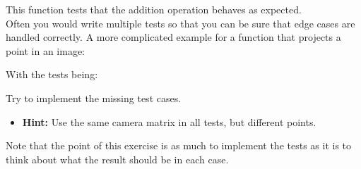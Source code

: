 \documentclass[a4paper, 10pt]{article}
\begin{document}


This function tests that the addition operation behaves as expected.
\\
Often you would write multiple tests so that you can be sure that edge cases are handled correctly.
A more complicated example for a function that projects a point in an image:



With the tests being:



Try to implement the missing test cases.
\begin{itemize}
	\item \textbf{Hint:} Use the same camera matrix in all tests, but different points.
\end{itemize}

Note that the point of this exercise is as much to implement the tests as it is to think about what the result should be in each case.

\printbibliography
\end{document}
